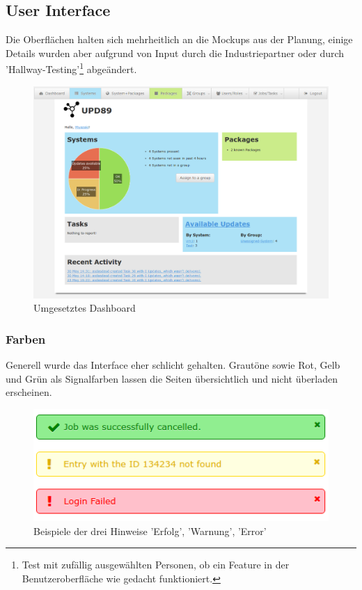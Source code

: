 \subsection*{User Interface}

Die Oberflächen halten sich mehrheitlich an die Mockups aus der Planung, einige Details wurden aber aufgrund von Input durch die Industriepartner oder durch 'Hallway-Testing'\footnote{Test mit zufällig ausgewählten Personen, ob ein Feature in der Benutzeroberfläche wie gedacht funktioniert.} abgeändert.

\begin{figure}[H]
	\centering
	\includegraphics[width=\linewidth]{files/upd89-screenshot_dashboard}
	\caption{Umgesetztes Dashboard}
	\label{fig:design:dashboard}
\end{figure}

\subsubsection*{Farben}

Generell wurde das Interface eher schlicht gehalten. Grautöne sowie Rot, Gelb und Grün als Signalfarben lassen die Seiten übersichtlich und nicht überladen erscheinen.

\begin{figure}[H]
	\centering
	\includegraphics[width=0.5\linewidth]{files/messages}
	\caption{Beispiele der drei Hinweise 'Erfolg', 'Warnung', 'Error'}
	\label{fig:design:messages}
\end{figure}




